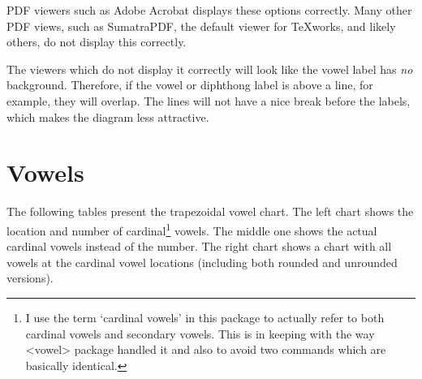 \documentclass{article}
\newcommand{\pkg}[1]{\texttt{#1}}
\def\texttt#1{<#1>}%
\begin{document}
PDF viewers such as Adobe Acrobat displays these options correctly.  Many other PDF views, such as SumatraPDF, the default viewer for TeXworks, and likely others, do not display this correctly.

The viewers which do not display it correctly will look like the vowel label has \textit{no} background.  Therefore, if the vowel or diphthong label is above a line, for example, they will overlap.  The lines will not have a nice break before the labels, which makes the diagram less attractive.


\section{Vowels}
\label{sec:Vowels}

The following tables present the trapezoidal vowel chart.  The left chart shows the location and number of cardinal\footnote{I use the term `cardinal vowels' in this package to actually refer to both cardinal vowels and secondary vowels.  This is in keeping with the way \pkg{vowel} package handled it and also to avoid two commands which are basically identical.\label{footnote:cardinal vowel}} vowels.  The middle one shows the actual cardinal vowels instead of the number.  The right chart shows a chart with all vowels at the cardinal vowel locations (including both rounded and unrounded versions).
\end{document}
